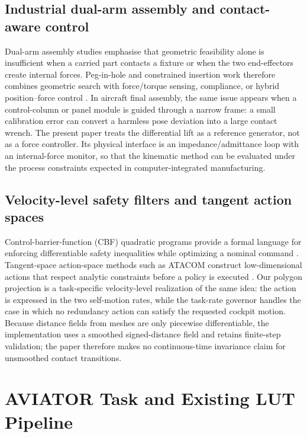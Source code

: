 \documentclass[preprint,12pt]{elsarticle}
\begin{document}
\subsection{Industrial dual-arm assembly and contact-aware control}

Dual-arm assembly studies emphasise that geometric feasibility alone is insufficient when a carried part contacts a fixture or when the two end-effectors create internal forces. Peg-in-hole and constrained insertion work therefore combines geometric search with force/torque sensing, compliance, or hybrid position--force control \cite{huang2022peghole,alles2022centralize,liu2022assemblyreview}. In aircraft final assembly, the same issue appears when a control-column or panel module is guided through a narrow frame: a small calibration error can convert a harmless pose deviation into a large contact wrench. The present paper treats the differential lift as a reference generator, not as a force controller. Its physical interface is an impedance/admittance loop with an internal-force monitor, so that the kinematic method can be evaluated under the process constraints expected in computer-integrated manufacturing.

\subsection{Velocity-level safety filters and tangent action spaces}

Control-barrier-function (CBF) quadratic programs provide a formal language for enforcing differentiable safety inequalities while optimizing a nominal command \cite{ames2019cbf,ames2017cbf}. Tangent-space action-space methods such as ATACOM construct low-dimensional actions that respect analytic constraints before a policy is executed \cite{liu2022atacom}. Our polygon projection is a task-specific velocity-level realization of the same idea: the action is expressed in the two self-motion rates, while the task-rate governor handles the case in which no redundancy action can satisfy the requested cockpit motion. Because distance fields from meshes are only piecewise differentiable, the implementation uses a smoothed signed-distance field and retains finite-step validation; the paper therefore makes no continuous-time invariance claim for unsmoothed contact transitions.

\section{AVIATOR Task and Existing LUT Pipeline}
\label{sec:aviator}
\end{document}
